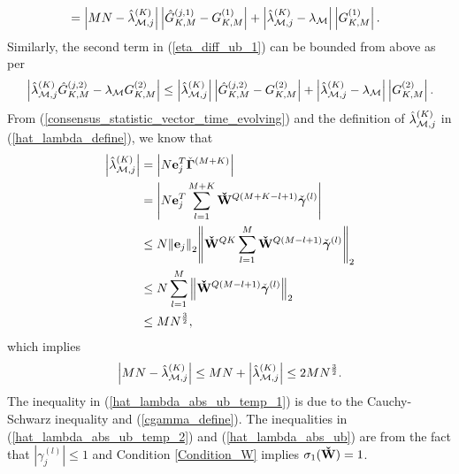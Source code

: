 \documentclass[11pt, draftclsnofoot, onecolumn]{IEEEtran}
\newcommand{\cbgamma}{{\check{\boldsymbol{\gamma}}}}
\newcommand{\cbGamma}{{\check{\boldsymbol{\Gamma}}}}
\newcommand{\cW}{{\check{W}}}
\begin{document}
\begin{IEEEproof}
\begin{align}
& = \left| {MN - \hat \lambda _{{\cal M},j}^{(K)}} \right|\left| {\hat G_{K,M}^{(j,1)} - G_{K,M}^{(1)}} \right| + \left| {\hat \lambda _{{\cal M},j}^{(K)} - {\lambda _{\cal M}}} \right|\left| {G_{K,M}^{(1)}} \right|.
\end{align}
Similarly, the second term in (\ref{eta_diff_ub_1}) can be bounded from above as per
\begin{align}  \label{eta_diff_2nd_term_ub_1}
\left| {\hat \lambda _{{\cal M},j}^{(K)}\hat G_{K,M}^{(j,2)} - {\lambda _{\cal M}}G_{K,M}^{(2)}} \right| \le \left| {\hat \lambda _{{\cal M},j}^{(K)}} \right|\left| {\hat G_{K,M}^{(j,2)} - G_{K,M}^{(2)}} \right| + \left| {\hat \lambda _{{\cal M},j}^{(K)} - {\lambda _{\cal M}}} \right|\left| {G_{K,M}^{(2)}} \right|.
\end{align}
From (\ref{consensus_statistic_vector_time_evolving}) and the definition of ${\hat \lambda _{{\cal M},j}^{(K)}}$ in (\ref{hat_lambda_define}), we know that 
\begin{align} \notag
\left| {\hat \lambda _{{\cal M},j}^{(K)}} \right| & = \left| {N{\bf{e}}_j^T{\cbGamma ^{\left( {M + K} \right)}}} \right|\\ \notag
& = \left| {N{\bf{e}}_j^T\sum\limits_{l = 1}^{M + K} {{{\bf{\cW}}^{Q\left( {M + K - l + 1} \right)}}{\cbgamma ^{(l)}}} } \right|\\ \label{hat_lambda_abs_ub_temp_1}
& \le N{\left\| {{{\bf{e}}_j}} \right\|_2}{\left\| {{{\bf{\cW}}^{QK}}\sum\limits_{l = 1}^M {{{\bf{\cW}}^{Q\left( {M - l + 1} \right)}}{\cbgamma ^{(l)}}} } \right\|_2}\\ \label{hat_lambda_abs_ub_temp_2}
& \le N\sum\limits_{l = 1}^M {{{\left\| {{{\bf{\cW}}^{Q\left( {M - l + 1} \right)}}{\cbgamma ^{(l)}}} \right\|}_2}} \\ \label{hat_lambda_abs_ub}
& \le M{N^{\frac{3}{2}}},
\end{align}
which implies
\begin{equation} \label{MN_lambda_abs_ub}
\left| {MN - \hat \lambda _{{\cal M},j}^{(K)}} \right| \le MN + \left| {\hat \lambda _{{\cal M},j}^{(K)}} \right| \le 2M{N^{\frac{3}{2}}}.
\end{equation}
The inequality in (\ref{hat_lambda_abs_ub_temp_1}) is due to the Cauchy-Schwarz inequality and (\ref{cgamma_define}). The inequalities in (\ref{hat_lambda_abs_ub_temp_2}) and (\ref{hat_lambda_abs_ub}) are from the fact that $|{\gamma_j ^{(l)}}|\le 1$ and Condition \ref{Condition_W} implies ${\sigma _1}( {\bf{\cW}} ) = 1$.


\end{IEEEproof}
\end{document}
